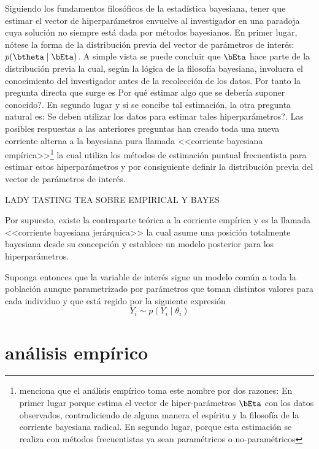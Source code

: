 \documentclass[10pt,openright]{book}\usepackage[]{graphicx}\usepackage[]{color}
\begin{document}
Siguiendo los fundamentos filos\'oficos de la estad\'istica bayesiana, tener que estimar el vector de hiperpar\'ametros envuelve al investigador en una paradoja cuya soluci\'on no siempre est\'a dada por m\'etodos bayesianos. En primer lugar, n\'otese la forma de la distribuci\'on previa del vector de par\'ametros de inter\'es: $p(\btheta \mid \bEta)$. A simple vista se puede concluir que $\bEta$ hace parte de la distribuci\'on previa la cual, seg\'un la l\'ogica de la filosof\'ia bayesiana, involucra el conocimiento del investigador antes de la recolecci\'on de los datos. Por tanto la pregunta directa que surge es Por qu\'e estimar algo que se deber\'ia suponer conocido?. En segundo lugar y si se concibe tal estimaci\'on, la otra pregunta natural es: Se deben utilizar los datos para estimar tales hiperpar\'ametros?. Las posibles respuestas a las anteriores preguntas han creado toda una nueva corriente alterna a la bayesiana pura llamada <<corriente bayesiana emp\'irica>>\footnote{ menciona que el an\'alisis emp\'irico toma este nombre por dos razones: En primer lugar porque estima el vector de hiper-par\'ametros $\bEta$ con los datos observados, contradiciendo de alguna manera el esp\'iritu y la filosof\'ia de la corriente bayesiana radical. En segundo lugar, porque esta estimaci\'on se realiza con m\'etodos frecuentistas ya sean param\'etricos o no-param\'etricos} la cual utiliza los m\'etodos de estimaci\'on puntual frecuentista para estimar estos hiperpar\'ametros y por consiguiente definir la distribuci\'on previa del vector de par\'ametros de inter\'es.

LADY TASTING TEA SOBRE EMPIRICAL Y BAYES

Por supuesto, existe la contraparte te\'orica a la corriente emp\'irica y es la llamada <<corriente bayesiana jer\'arquica>> la cual asume una posici\'on totalmente bayesiana desde su concepci\'on y establece un modelo posterior para los hiperpar\'ametros.

Suponga entonces que la variable de inter\'es sigue un modelo com\'un a toda la poblaci\'on aunque parametrizado por par\'ametros que toman distintos valores para cada individuo y que est\'a regido por la siguiente expresi\'on
\begin{equation*}
Y_i\sim p(Y_i \mid \theta_i)
\end{equation*}

\section{an\'alisis emp\'irico}
\end{document}

